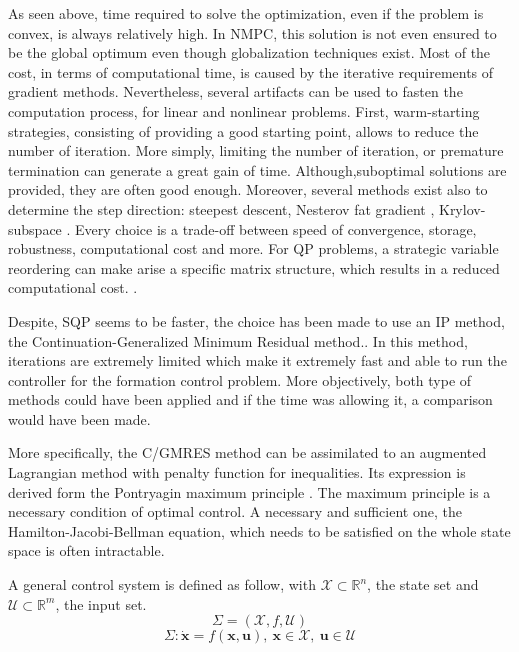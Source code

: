 \documentclass[a4paper, 12pt]{report}
\begin{document}
As seen above, time required to solve the optimization, even if the problem is convex, is always relatively high. In NMPC, this solution is not even ensured to be the global optimum even though globalization techniques exist.  Most of the cost, in terms of computational time, is caused by the iterative requirements of gradient methods. Nevertheless, several artifacts can be used to fasten the computation process, for linear and nonlinear problems. First, warm-starting strategies, consisting of providing a good starting point, allows to reduce the number of iteration. More simply, limiting the number of iteration, or premature termination can generate a great gain of time. Although,suboptimal solutions are provided, they are often good enough. Moreover, several methods exist also to determine the step direction: steepest descent, Nesterov fat gradient \cite{Richter2012}, Krylov-subspace \cite{Ohtsuka2004}. Every choice is a trade-off between speed of convergence, storage, robustness, computational cost and more. For QP problems, a strategic variable reordering can make arise a specific matrix structure, which results in a reduced computational cost. \cite{Wang2008}.

Despite, SQP seems to be faster, the choice has been made to use an IP method, the Continuation-Generalized Minimum Residual method.\cite{Ohtsuka2004}. In this method, iterations are extremely limited which make it extremely fast and able to run the controller for the formation control problem. More objectively, both type of methods could have been applied and if the time was allowing it, a comparison would have been made.

More specifically, the C/GMRES method can be assimilated to an augmented Lagrangian method with penalty function for inequalities. Its expression is derived form the Pontryagin maximum principle \cite{Pontryagin1987, Lewis2006, Murray2010}. The maximum principle is a necessary condition of optimal control. A necessary and sufficient one, the Hamilton-Jacobi-Bellman equation, which needs to be satisfied on the whole state space is often intractable.

A general control system is defined as follow, with $\mathcal{X} \subset \mathbb{R}^n$, the state set and $\mathcal{U} \subset \mathbb{R}^m$, the input set.
\[ \Sigma = (\mathcal{X}, f, \mathcal{U}) \]
\[ \Sigma: \boldsymbol{\dot x} = f(\boldsymbol{x}, \boldsymbol{u}),\ \boldsymbol{x} \in \mathcal{X},\ \boldsymbol{u} \in \mathcal{U} \]
\end{document}
